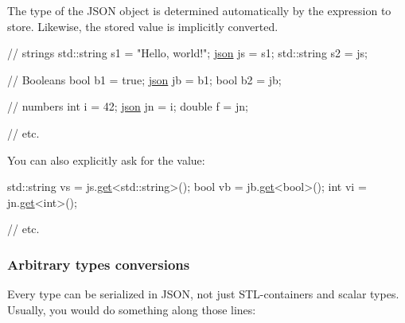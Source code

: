 The type of the J\+S\+ON object is determined automatically by the expression to store. Likewise, the stored value is implicitly converted.


\begin{DoxyCode}
\textcolor{comment}{// strings}
std::string s1 = \textcolor{stringliteral}{"Hello, world!"};
\hyperlink{classnlohmann_1_1basic__json}{json} js = s1;
std::string s2 = js;

\textcolor{comment}{// Booleans}
\textcolor{keywordtype}{bool} b1 = \textcolor{keyword}{true};
\hyperlink{classnlohmann_1_1basic__json}{json} jb = b1;
\textcolor{keywordtype}{bool} b2 = jb;

\textcolor{comment}{// numbers}
\textcolor{keywordtype}{int} i = 42;
\hyperlink{classnlohmann_1_1basic__json}{json} jn = i;
\textcolor{keywordtype}{double} f = jn;

\textcolor{comment}{// etc.}
\end{DoxyCode}


You can also explicitly ask for the value\+:


\begin{DoxyCode}
std::string vs = js.\hyperlink{classnlohmann_1_1basic__json_a6b187a22994c12c8cae0dd5ee99dc85e}{get}<std::string>();
\textcolor{keywordtype}{bool} vb = jb.\hyperlink{classnlohmann_1_1basic__json_a6b187a22994c12c8cae0dd5ee99dc85e}{get}<\textcolor{keywordtype}{bool}>();
\textcolor{keywordtype}{int} vi = jn.\hyperlink{classnlohmann_1_1basic__json_a6b187a22994c12c8cae0dd5ee99dc85e}{get}<\textcolor{keywordtype}{int}>();

\textcolor{comment}{// etc.}
\end{DoxyCode}


\subsubsection*{Arbitrary types conversions}

Every type can be serialized in J\+S\+ON, not just S\+T\+L-\/containers and scalar types. Usually, you would do something along those lines\+:


